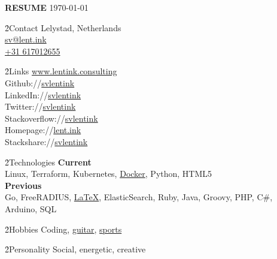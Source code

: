 \LARGE \textbf{RESUME}
\scriptsize \today \normalsize



\h{2}{Contact}{}
Lelystad, Netherlands \\
\href{mailto:sv@lent.ink}{sv@lent.ink} \\
\href{tel:0031617012655}{+31 617012655}

\h{2}{Links}{}
\href{https://lentink.consulting}{www.lentink.consulting} \\
Github://\href{http://github.com/svlentink}{svlentink} \\
LinkedIn://\href{http://linkedin.com/in/svlentink}{svlentink} \\
Twitter://\href{http://twitter.com/svlentink}{svlentink} \\
Stackoverflow://\href{http://stackoverflow.com/users/3037245/svlentink}{svlentink} \\
Homepage://\href{http://lent.ink}{lent.ink} \\
Stackshare://\href{http://stackshare.io/svlentink/lent-ink}{svlentink}

\h{2}{Technologies}{}
\textbf{Current} \\
Linux,
Terraform,
Kubernetes,
\href{http://hub.docker.com/r/svlentink}{Docker},
Python,
HTML5
\\
\textbf{Previous} \\
Go,
FreeRADIUS,
\href{https://github.com/svlentink/resume}{LaTeX},
ElasticSearch,
Ruby,
Java,
Groovy,
PHP,
C\#,
Arduino,
SQL


\h{2}{Hobbies}{}
Coding,
\href{http://lent.ink/projects/chords}{guitar},
\href{http://lent.ink/projects/run}{sports}

\h{2}{Personality}{}
Social, energetic, creative


